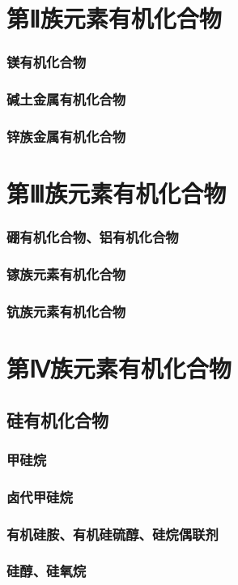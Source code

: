 \documentclass[UTF8]{../03-Chemistry}
\begin{document}
\section{第Ⅱ族元素有机化合物}
    \subsubsection{镁有机化合物}
    \subsubsection{碱土金属有机化合物}
    \subsubsection{锌族金属有机化合物}
\section{第Ⅲ族元素有机化合物}
    \subsubsection{硼有机化合物、铝有机化合物}
    \subsubsection{镓族元素有机化合物}
    \subsubsection{钪族元素有机化合物}
\section{第Ⅳ族元素有机化合物}
    \subsection{硅有机化合物}
        \subsubsection{甲硅烷}
        \subsubsection{卤代甲硅烷}
        \subsubsection{有机硅胺、有机硅硫醇、硅烷偶联剂}
        \subsubsection{硅醇、硅氧烷}
\end{document}
